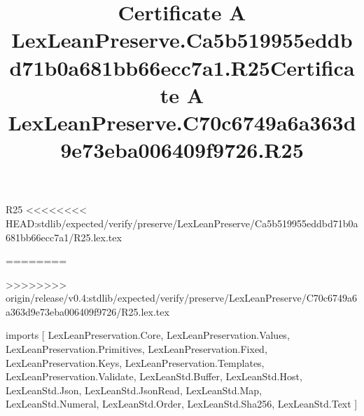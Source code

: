 \begin{lexlean}{R25}
<<<<<<<< HEAD:stdlib/expected/verify/preserve/LexLeanPreserve/Ca5b519955eddbd71b0a681bb66ecc7a1/R25.lex.tex
\title{Certificate A LexLeanPreserve.Ca5b519955eddbd71b0a681bb66ecc7a1.R25}
========
\title{Certificate A LexLeanPreserve.C70c6749a6a363d9e73eba006409f9726.R25}
>>>>>>>> origin/release/v0.4:stdlib/expected/verify/preserve/LexLeanPreserve/C70c6749a6a363d9e73eba006409f9726/R25.lex.tex
\begin{coremodule}
imports [
  LexLeanPreservation.Core,
  LexLeanPreservation.Values,
  LexLeanPreservation.Primitives,
  LexLeanPreservation.Fixed,
  LexLeanPreservation.Keys,
  LexLeanPreservation.Templates,
  LexLeanPreservation.Validate,
  LexLeanStd.Buffer,
  LexLeanStd.Host,
  LexLeanStd.Json,
  LexLeanStd.JsonRead,
  LexLeanStd.Map,
  LexLeanStd.Numeral,
  LexLeanStd.Order,
  LexLeanStd.Sha256,
  LexLeanStd.Text
]


\end{coremodule}
\end{lexlean}
